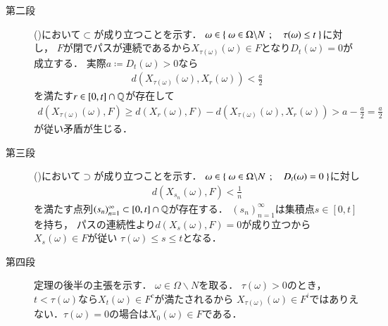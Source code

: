 \begin{prf}
\begin{description}
			\item[第二段]
				()において$\subset$が成り立つことを示す．
				$\omega \in \left\{\ \omega \in \Omega \backslash N\ \, ; \quad \tau(\omega) \leq t\ \right\}$に対し，
				$F$が閉でパスが連続であるから$X_{\tau(\omega)}(\omega) \in F$となり$D_t(\omega) = 0$が成立する．
				実際$a \coloneqq D_t(\omega) > 0$なら
				\begin{align}
					d(X_{\tau(\omega)}(\omega), X_r(\omega)) < \frac{a}{2}
				\end{align}
				を満たす$r \in [0,t] \cap \mathbb{Q}$が存在して
				\begin{align}
					d(X_{\tau(\omega)}(\omega),F) \geq d(X_r(\omega),F) - d(X_{\tau(\omega)}(\omega), X_r(\omega)) > a - \frac{a}{2} = \frac{a}{2}
				\end{align}
				が従い矛盾が生じる．
			
			\item[第三段]
				()において$\supset$が成り立つことを示す．
				$\omega \in \left\{\ \omega \in \Omega \backslash N\ \, ; \quad D_t(\omega) = 0\ \right\}$に対し
				\begin{align}
					d(X_{s_n}(\omega),F) < \frac{1}{n}
				\end{align}
				を満たす点列$(s_n)_{n=1}^{\infty} \subset [0,t] \cap \mathbb{Q}$が存在する．
				$(s_n)_{n=1}^{\infty}$は集積点$s \in [0,t]$を持ち，
				パスの連続性より$d(X_s(\omega),F) = 0$が成り立つから$X_s(\omega) \in F$が従い
				$\tau(\omega) \leq s \leq t$となる．
				
			\item[第四段]
				定理の後半の主張を示す．
				$\omega \in \Omega \backslash N$を取る．
				$\tau(\omega) > 0$のとき，$t < \tau(\omega)$なら$X_t(\omega) \in F^c$が満たされるから
				$X_{\tau(\omega)}(\omega) \in F^i$ではありえない．$\tau(\omega) = 0$の場合は$X_0(\omega) \in F$である．
				\QED
		\end{description}
	\end{prf}
	